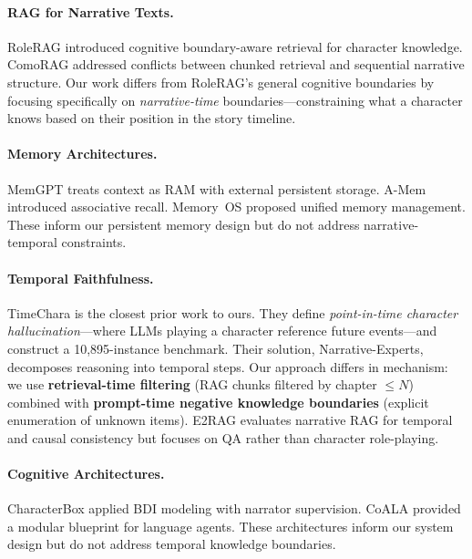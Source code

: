 \documentclass[11pt,a4paper]{article}
\begin{document}
\paragraph{RAG for Narrative Texts.}
RoleRAG \citep{rolerag2025} introduced cognitive boundary-aware retrieval for character knowledge.
ComoRAG \citep{comorag2026} addressed conflicts between chunked retrieval and sequential narrative structure.
Our work differs from RoleRAG's general cognitive boundaries by focusing specifically on \textit{narrative-time} boundaries---constraining what a character knows based on their position in the story timeline.

\paragraph{Memory Architectures.}
MemGPT \citep{packer2023memgpt} treats context as RAM with external persistent storage.
A-Mem \citep{amem2025} introduced associative recall.
Memory~OS \citep{memoryos2025} proposed unified memory management.
These inform our persistent memory design but do not address narrative-temporal constraints.

\paragraph{Temporal Faithfulness.}
TimeChara \citep{ahn2024timechara} is the closest prior work to ours.
They define \textit{point-in-time character hallucination}---where LLMs playing a character reference future events---and construct a 10,895-instance benchmark.
Their solution, Narrative-Experts, decomposes reasoning into temporal steps.
Our approach differs in mechanism: we use \textbf{retrieval-time filtering} (RAG chunks filtered by chapter $\leq N$) combined with \textbf{prompt-time negative knowledge boundaries} (explicit enumeration of unknown items).
E2RAG \citep{e2rag2025} evaluates narrative RAG for temporal and causal consistency but focuses on QA rather than character role-playing.

\paragraph{Cognitive Architectures.}
CharacterBox \citep{wang2025characterbox} applied BDI modeling with narrator supervision.
CoALA \citep{sumers2024coala} provided a modular blueprint for language agents.
These architectures inform our system design but do not address temporal knowledge boundaries.
\end{document}
